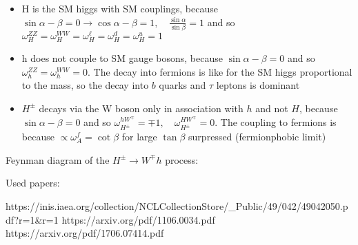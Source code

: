 \documentclass[12pt,oneside]{book}
\begin{document}
\begin{itemize}
    \item H is the SM higgs with SM couplings, because $\sin{\alpha-\beta} = 0 \to \cos{\alpha-\beta} = 1, \quad \frac{\sin{\alpha}}{\sin{\beta}} = 1$ and so $\omega^{ZZ}_{H} = \omega^{WW}_{H} = \omega^{\ell}_H = \omega^{d}_H = \omega^{u}_H = 1$
    \item h does not couple to SM gauge bosons, because $\sin{\alpha-\beta} = 0$ and so $\omega^{ZZ}_{h} = \omega^{WW}_{h} = 0$. The decay into fermions is like for the SM higgs proportional to the mass, so the decay into $b$ quarks and $\tau$ leptons is dominant
    \item $H^{\pm}$ decays via the W boson only in association with $h$ and not $H$, because $\sin{\alpha-\beta} = 0$ and so $\omega^{hW^{\mp}}_{H^{\pm}} = \mp 1, \quad \omega^{HW^{\mp}}_{H^{\pm}} = 0$. The coupling to fermions is because $\propto \omega_A^{f} = \cot{\beta}$ for large $\tan{\beta}$ surpressed (fermionphobic limit)
\end{itemize}

Feynman diagram of the $H^{\pm} \to W^{\mp}h$ process:



Used papers:

https://inis.iaea.org/collection/NCLCollectionStore/_Public/49/042/49042050.pdf?r=1&r=1
https://arxiv.org/pdf/1106.0034.pdf
https://arxiv.org/pdf/1706.07414.pdf
\end{document}
